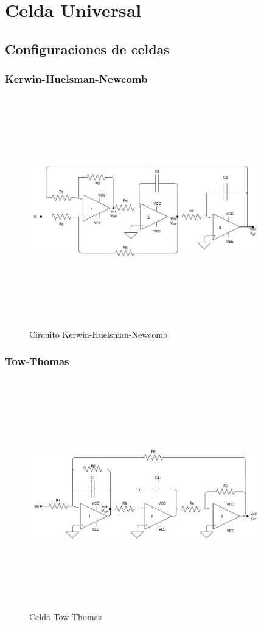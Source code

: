 \section{Celda Universal}

\subsection{Configuraciones de celdas}

\subsubsection{Kerwin-Huelsman-Newcomb}

\begin{figure}[H] %
	\centering
	\includegraphics[width=10cm,height=10cm,keepaspectratio]{../EJ4/kerwin.png}
	\caption{Circuito Kerwin-Huelsman-Newcomb}
	\label{kerwin}
\end{figure}

\subsubsection{Tow-Thomas}

\begin{figure}[H] %
	\centering
	\includegraphics[width=10cm,height=10cm,keepaspectratio]{../EJ4/tow_thomas.png}
	\caption{Celda Tow-Thomas}
	\label{tow_thomas}
\end{figure}

